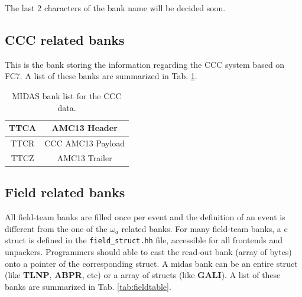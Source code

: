 The last 2 characters of the bank name will be decided soon.

\subsection{CCC related banks}

This is the bank storing the information regarding the CCC system based on FC7.
A list of these banks are summarized in Tab. \ref{tab:ccctable}.

\begin{table}[htbp]
\centering
\caption{MIDAS bank list for the CCC data.}
\begin{tabular}{|c|c|}
\hline 
TTCA & AMC13 Header \\
\hline
TTCR & CCC AMC13 Payload\\
\hline
TTCZ & AMC13 Trailer \\
\hline
\end{tabular} 
\label{tab:ccctable}
\end{table}


\subsection{Field related banks}

All field-team banks are filled once per event and the definition of an event is different from the one of the $\omega_{a}$ related banks.
For many field-team banks, a c struct is defined in the \verb+field_struct.hh+ file, accessible for all frontends and unpackers. Programmers should able to cast the read-out bank (array of bytes) onto a pointer of the corresponding struct. A midas bank can be an entire struct (like \textbf{TLNP}, \textbf{ABPR}, etc) or a array of structs (like \textbf{GALI}). A list of these banks are summarized in Tab. \ref{tab:fieldtable}.


